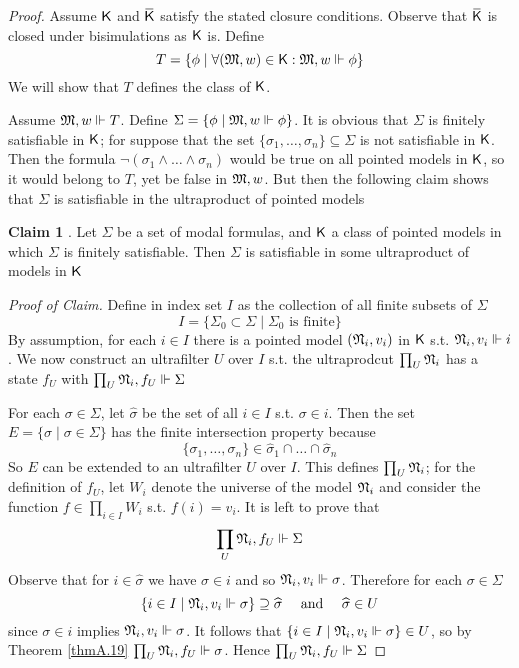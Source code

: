 \documentclass[11pt]{article}
\begin{document}
\begin{proof}
Assume \(\textsf{K}\) and \(\bbar{\sfK}\) satisfy the stated closure conditions.
Observe that \(\bbar{\sfK}\) is closed under bisimulations as \(\textsf{K}\) is.
Define
\begin{equation*}
T=\{\phi\mid\forall(\mathfrak{M},w)\in\textsf{K}:\mathfrak{M},w\Vdash\phi\}
\end{equation*}
We will show that \(T\) defines the class of \(\textsf{K}\).

Assume \(\mathfrak{M},w\Vdash T\). Define \(\Sigma=\{\phi\mid\mathfrak{M},w\Vdash\phi\}\). It is
obvious that \(\Sigma\) is finitely satisfiable in \(\textsf{K}\); for suppose that the set
\(\{\sigma_1,\dots,\sigma_n\}\subseteq\Sigma\) is not satisfiable in
\(\textsf{K}\). Then the formula \(\neg(\sigma_1\wedge\dots\wedge\sigma_n)\) would
be true on all pointed models in \(\textsf{K}\), so it would belong to \(T\), yet
be false in \(\mathfrak{M},w\). But then the following claim shows that \(\Sigma\) is
satisfiable in the ultraproduct of pointed models

\textbf{Claim 1} . Let \(\Sigma\) be a set of modal formulas, and \(\textsf{K}\) a class of pointed
 models in which \(\Sigma\) is finitely satisfiable. Then \(\Sigma\) is satisfiable in some
 ultraproduct of models in \(\textsf{K}\)

\emph{Proof of Claim.} Define in index set \(I\) as the collection of all finite
subsets of \(\Sigma\)
\begin{equation*}
I=\{\Sigma_0\subset\Sigma\mid \Sigma_0\text{ is finite}\}
\end{equation*}
By assumption, for each \(i\in I\) there is a pointed model \((\mathfrak{N}_i,v_i)\)
in \(\textsf{K}\) s.t. \(\mathfrak{N}_i,v_i\Vdash i\). We now construct an ultrafilter
\(U\) over \(I\) s.t. the ultraprodcut \(\prod_U\mathfrak{N}_i\) has a state \(f_U\)
with \(\prod_U\mathfrak{N}_i,f_U\Vdash\Sigma\)

For each \(\sigma\in\Sigma\), let \(\widehat{\sigma}\) be the set of all \(i\in
     I\) s.t. \(\sigma\in i\). Then the set
\(E=\{\widehat{\sigma}\mid\sigma\in\Sigma\}\) has the finite intersection
property because
\begin{equation*}
\{\sigma_1,\dots,\sigma_n\}\in\widehat{\sigma}_1\cap\dots\cap\widehat{\sigma}_n
\end{equation*}
So \(E\) can be extended to an ultrafilter \(U\) over \(I\). This defines
\(\prod_U\mathfrak{N}_i\); for the definition of \(f_U\), let \(W_i\) denote the
universe of the model \(\mathfrak{N}_i\) and consider the function \(f\in\prod_{i\in
     I}W_i\) s.t. \(f(i)=v_i\).
It is left to prove that
\begin{equation*}
\prod_U\mathfrak{N}_i,f_U\Vdash\Sigma
\end{equation*}
Observe that for \(i\in\widehat{\sigma}\) we have \(\sigma\in i\) and so
\(\mathfrak{N}_i,v_i\Vdash\sigma\). Therefore for each \(\sigma\in\Sigma\)
\begin{equation*}
\{i\in I\mid\mathfrak{N}_i,v_i\Vdash\sigma\}\supseteq\widehat{\sigma} \quad\text{ and }\quad
\widehat{\sigma}\in U
\end{equation*}
since \(\sigma\in i\) implies \(\mathfrak{N}_i,v_i\Vdash\sigma\). It follows that
\(\{i\in I\mid\mathfrak{N}_i,v_i\Vdash\sigma\}\in U\), so by Theorem \ref{thmA.19}
\(\prod_U\mathfrak{N}_i,f_U\Vdash\sigma\). Hence \(\prod_U\mathfrak{N}_i,f_U\Vdash\Sigma\)


\end{proof}
\end{document}
